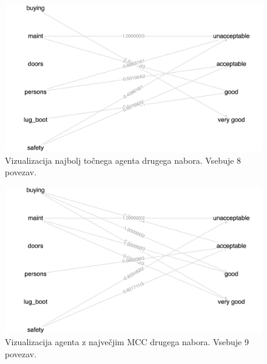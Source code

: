 \begin{figure}[H]
    \begin{center}
        \includegraphics[width=13cm]{car/2/acc_g}
    \end{center}
    \caption{Vizualizacija najbolj točnega agenta drugega nabora. Vsebuje 8 povezav.}
    \label{fig:car_acc_2_g}
\end{figure}

\begin{figure}[H]
    \begin{center}
        \includegraphics[width=13cm]{car/2/mcc_g}
    \end{center}
    \caption{Vizualizacija agenta z največjim MCC drugega nabora. Vsebuje 9 povezav.}
    \label{fig:car_mcc_2_g}
\end{figure}

